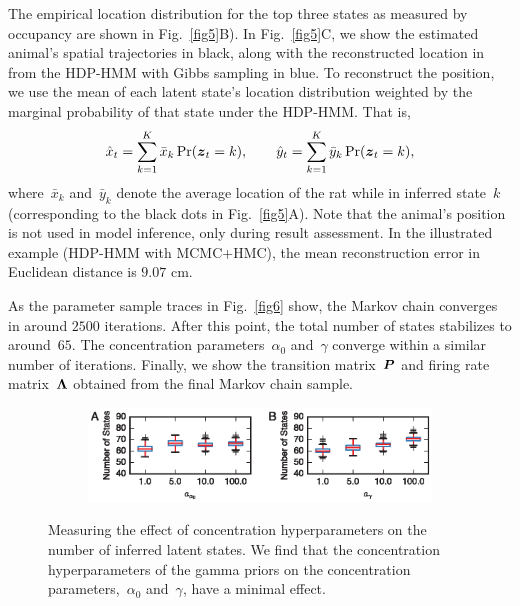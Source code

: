 The empirical location distribution for the top three states as
measured by occupancy are shown in Fig.~\ref{fig5}B). In
Fig.~\ref{fig5}C, we show the estimated animal's spatial trajectories
in black, along with the reconstructed location in from the HDP-HMM
with Gibbs sampling in blue. To reconstruct the position, we use the
mean of each latent state's location distribution weighted by the
marginal probability of that state under the HDP-HMM. That is,
\begin{align*}
\hat{x}_t = \sum_{k=1}^K \bar{x}_k \Pr(\boldsymbol{z}_t=k), \qquad
\hat{y}_t = \sum_{k=1}^K  \bar{y}_k \Pr(\boldsymbol{z}_t=k),
\end{align*}
where~$\bar{x}_k$ and~$\bar{y}_k$ denote the average location of the
rat while in inferred state~$k$ (corresponding to the black dots in
Fig.~\ref{fig5}A). Note that the animal's position is not used in
model inference, only during result assessment. In the illustrated
example (HDP-HMM with MCMC+HMC), the mean reconstruction error in
Euclidean distance is $9.07$ cm.



As the parameter sample traces in Fig.~\ref{fig6} show, the Markov
chain converges in around $2500$ iterations. After this point, the total
number of states stabilizes to around~$65$.  The concentration
parameters~$\alpha_0$ and~$\gamma$ converge within a similar number of
iterations.  Finally, we show the transition matrix~$\boldsymbol{P}$ and firing
rate matrix~$\boldsymbol{\Lambda}$ obtained from the final Markov chain sample.


\begin{figure}[t!]
  \centering
  \begin{subfigure}[t]{5in}
    \includegraphics[width=\textwidth]{figures/ch7/Fig7}
  \end{subfigure}
  \caption[Effect of concentration hyperparameters]{Measuring the
    effect of concentration hyperparameters on the number of inferred
    latent states. We find that the concentration hyperparameters of
    the gamma priors on the concentration parameters,~$\alpha_0$
    and~$\gamma$, have a minimal effect.}
  \label{fig7}
\end{figure}



